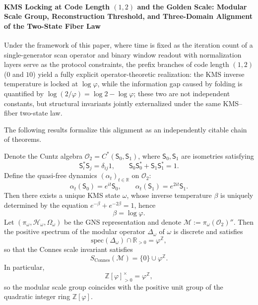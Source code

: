 \paragraph{KMS Locking at Code Length \texorpdfstring{$(1,2)$}{(1,2)} and the Golden Scale: Modular Scale Group, Reconstruction Threshold, and Three-Domain Alignment of the Two-State Fiber Law}
Under the framework of this paper, where time is fixed as the iteration count of a single-generator scan operator and binary window readout with normalization layers serve as the protocol constraints, the prefix branches of code length \((1,2)\) (\(0\) and \(10\)) yield a fully explicit operator-theoretic realization: the KMS inverse temperature is locked at \(\log\varphi\), while the information gap caused by folding is quantified by \(\log(2/\varphi)=\log 2-\log\varphi\); these two are not independent constants, but structural invariants jointly externalized under the same KMS--fiber two-state law.
\par
The following results formalize this alignment as an independently citable chain of theorems.
\par

\begin{theorem}\label{thm:xi-kms-code12-discrete-modular-scale-group}
Denote the Cuntz algebra \(\mathcal{O}_2=C^\ast(\mathsf{S}_0,\mathsf{S}_1)\), where \(\mathsf{S}_0,\mathsf{S}_1\) are isometries satisfying
\[
\mathsf{S}_i^\ast\mathsf{S}_j=\delta_{ij}1,
\qquad
\mathsf{S}_0\mathsf{S}_0^\ast+\mathsf{S}_1\mathsf{S}_1^\ast=1.
\]
Define the quasi-free dynamics \((\alpha_t)_{t\in\mathbb R}\) on \(\mathcal{O}_2\):
\[
\alpha_t(\mathsf{S}_0)=e^{it}\mathsf{S}_0,
\qquad
\alpha_t(\mathsf{S}_1)=e^{2it}\mathsf{S}_1.
\]
Then there exists a unique KMS state \(\omega\), whose inverse temperature \(\beta\) is uniquely determined by the equation \(e^{-\beta}+e^{-2\beta}=1\), hence
\[
\beta=\log\varphi.
\]
Let \((\pi_\omega,\mathcal H_\omega,\Omega_\omega)\) be the GNS representation and denote \(\mathcal M:=\pi_\omega(\mathcal{O}_2)''\).
Then the positive spectrum of the modular operator \(\Delta_\omega\) of \(\omega\) is discrete and satisfies
\[
\mathrm{spec}(\Delta_\omega)\cap\mathbb R_{>0}=\varphi^{\mathbb Z},
\]
so that the Connes scale invariant satisfies
\[
S_{\mathrm{Connes}}(\mathcal M)=\{0\}\cup\varphi^{\mathbb Z}.
\]
In particular,
\[
\mathbb Z[\varphi]_{>0}^\times=\varphi^{\mathbb Z},
\]
so the modular scale group coincides with the positive unit group of the quadratic integer ring \(\mathbb Z[\varphi]\).
\end{theorem}

